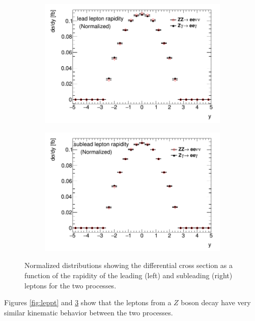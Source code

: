 \documentclass[11pt,a4paper,openright,twoside]{report}
\begin{document}
\begin{figure}[H]
\centering
	\begin{subfigure}{0.49\textwidth}
		\includegraphics[width=\linewidth]{leady.png}
		\caption{}
		\label{fig:leady}
	\end{subfigure}
	\begin{subfigure}{0.49\textwidth}
		\includegraphics[width=\linewidth]{subleady.png}
		\caption{}
		\label{fig:subleady}
	\end{subfigure}
	\caption{Normalized distributions showing the differential cross section as a function of the rapidity of the leading (left) and subleading (right) leptons for the two processes.}
	\label{fig:leptony}
\end{figure}

Figures \ref{fig:leppt} and \ref{fig:leptony} show that the leptons from a $Z$ boson decay have very similar kinematic behavior between the two processes.
\end{document}
